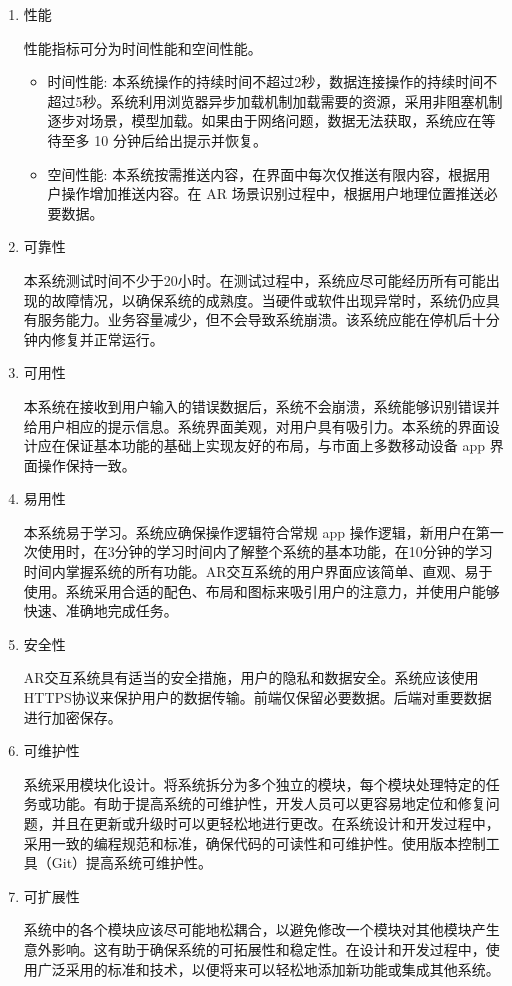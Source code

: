 \begin{enumerate}
  \item 性能
  
  性能指标可分为时间性能和空间性能。
  \begin{itemize}
    \item 时间性能: 本系统操作的持续时间不超过2秒，数据连接操作的持续时间不超过5秒。系统利用浏览器异步加载机制加载需要的资源，采用非阻塞机制逐步对场景，模型加载。如果由于网络问题，数据无法获取，系统应在等待至多 10 分钟后给出提示并恢复。
    \item 空间性能: 本系统按需推送内容，在界面中每次仅推送有限内容，根据用户操作增加推送内容。在 AR 场景识别过程中，根据用户地理位置推送必要数据。
  \end{itemize}

  \item 可靠性
  
  本系统测试时间不少于20小时。在测试过程中，系统应尽可能经历所有可能出现的故障情况，以确保系统的成熟度。当硬件或软件出现异常时，系统仍应具有服务能力。业务容量减少，但不会导致系统崩溃。该系统应能在停机后十分钟内修复并正常运行。

  \item 可用性

  本系统在接收到用户输入的错误数据后，系统不会崩溃，系统能够识别错误并给用户相应的提示信息。系统界面美观，对用户具有吸引力。本系统的界面设计应在保证基本功能的基础上实现友好的布局，与市面上多数移动设备 app 界面操作保持一致。
  
  \item 易用性
  
  本系统易于学习。系统应确保操作逻辑符合常规 app 操作逻辑，新用户在第一次使用时，在3分钟的学习时间内了解整个系统的基本功能，在10分钟的学习时间内掌握系统的所有功能。AR交互系统的用户界面应该简单、直观、易于使用。系统采用合适的配色、布局和图标来吸引用户的注意力，并使用户能够快速、准确地完成任务。

  \item 安全性
  
  AR交互系统具有适当的安全措施，用户的隐私和数据安全。系统应该使用HTTPS协议来保护用户的数据传输。前端仅保留必要数据。后端对重要数据进行加密保存。

  \item 可维护性
  
  系统采用模块化设计。将系统拆分为多个独立的模块，每个模块处理特定的任务或功能。有助于提高系统的可维护性，开发人员可以更容易地定位和修复问题，并且在更新或升级时可以更轻松地进行更改。在系统设计和开发过程中，采用一致的编程规范和标准，确保代码的可读性和可维护性。使用版本控制工具（Git）提高系统可维护性。

  \item 可扩展性
  
  系统中的各个模块应该尽可能地松耦合，以避免修改一个模块对其他模块产生意外影响。这有助于确保系统的可拓展性和稳定性。在设计和开发过程中，使用广泛采用的标准和技术，以便将来可以轻松地添加新功能或集成其他系统。
\end{enumerate}